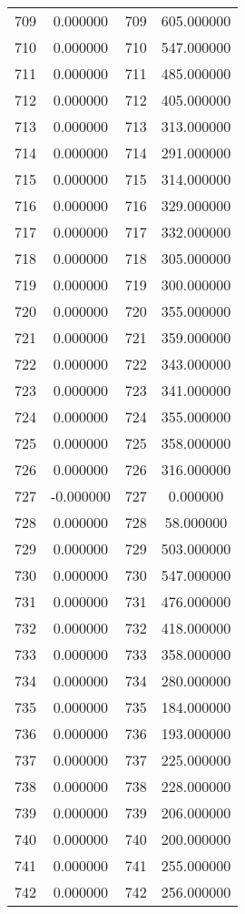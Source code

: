 \documentclass[12pt]{article}
\begin{document}
\begin{longtable}{@{}cccc@{}}
709 & 0.000000 & 709 & 605.000000 \\
710 & 0.000000 & 710 & 547.000000 \\
711 & 0.000000 & 711 & 485.000000 \\
712 & 0.000000 & 712 & 405.000000 \\
713 & 0.000000 & 713 & 313.000000 \\
714 & 0.000000 & 714 & 291.000000 \\
715 & 0.000000 & 715 & 314.000000 \\
716 & 0.000000 & 716 & 329.000000 \\
717 & 0.000000 & 717 & 332.000000 \\
718 & 0.000000 & 718 & 305.000000 \\
719 & 0.000000 & 719 & 300.000000 \\
720 & 0.000000 & 720 & 355.000000 \\
721 & 0.000000 & 721 & 359.000000 \\
722 & 0.000000 & 722 & 343.000000 \\
723 & 0.000000 & 723 & 341.000000 \\
724 & 0.000000 & 724 & 355.000000 \\
725 & 0.000000 & 725 & 358.000000 \\
726 & 0.000000 & 726 & 316.000000 \\
727 & -0.000000 & 727 & 0.000000 \\
728 & 0.000000 & 728 & 58.000000 \\
729 & 0.000000 & 729 & 503.000000 \\
730 & 0.000000 & 730 & 547.000000 \\
731 & 0.000000 & 731 & 476.000000 \\
732 & 0.000000 & 732 & 418.000000 \\
733 & 0.000000 & 733 & 358.000000 \\
734 & 0.000000 & 734 & 280.000000 \\
735 & 0.000000 & 735 & 184.000000 \\
736 & 0.000000 & 736 & 193.000000 \\
737 & 0.000000 & 737 & 225.000000 \\
738 & 0.000000 & 738 & 228.000000 \\
739 & 0.000000 & 739 & 206.000000 \\
740 & 0.000000 & 740 & 200.000000 \\
741 & 0.000000 & 741 & 255.000000 \\
742 & 0.000000 & 742 & 256.000000 \\

\end{longtable}
\end{document}
